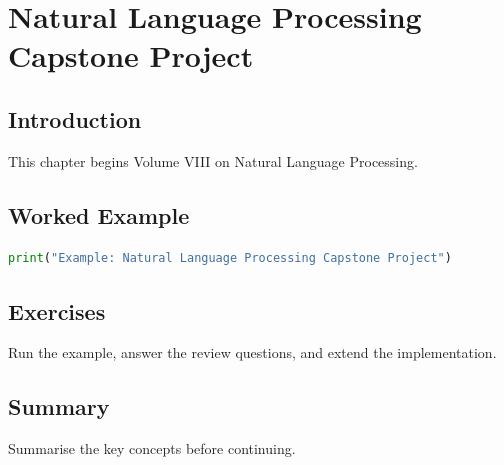 \chapter{Natural Language Processing Capstone Project}
\label{chap:vol8-5}



\section{Introduction}
This chapter begins Volume VIII on Natural Language Processing.

\section{Worked Example}
\begin{lstlisting}[language=Python]
print("Example: Natural Language Processing Capstone Project")
\end{lstlisting}

\section{Exercises}
\begin{exercise}
Run the example, answer the review questions, and extend the implementation.
\end{exercise}

\section{Summary}
Summarise the key concepts before continuing.
